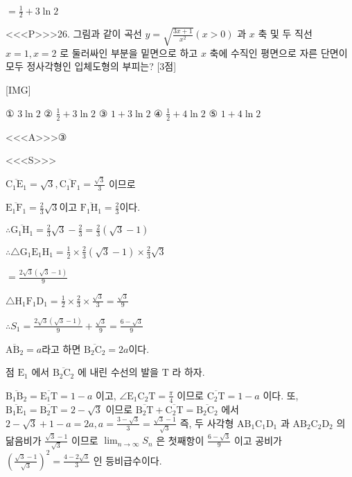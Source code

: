 \documentclass{oblivoir}
\begin{document}
$=\frac{1}{2}+3 \ln 2$


<<<P>>>26. 그림과 같이 곡선 $y=\sqrt{\frac{3 x+1}{x^{2}}}(x>0)$ 과 $x$ 축 및 두 직선 $x=1, x=2$ 로 둘러싸인 부분을 밑면으로 하고 $x$ 축에 수직인 평면으로 자른 단면이 모두 정사각형인 입체도형의 부피는? [3점]

[IMG]

① $3 \ln 2$
② $\frac{1}{2}+3 \ln 2$
③ $1+3 \ln 2$
④ $\frac{1}{2}+4 \ln 2$
⑤ $1+4 \ln 2$



<<<A>>>③

<<<S>>>



$\overline{\mathrm{C}_{1} \mathrm{E}_{1}}=\sqrt{3}, \overline{\mathrm{C}_{1} \mathrm{F}_{1}}=\frac{\sqrt{3}}{3}$ 이므로

$\overline{\mathrm{E}_{1} \mathrm{F}_{1}}=\frac{2}{3} \sqrt{3}$이고 $\overline{\mathrm{F}_{1} \mathrm{H}_{1}}=\frac{2}{3}$이다.

$\therefore \overline{\mathrm{G}_{1} \mathrm{H}_{1}}=\frac{2}{3} \sqrt{3}-\frac{2}{3}=\frac{2}{3}(\sqrt{3}-1)$

$\therefore \triangle \mathrm{G}_{1} \mathrm{E}_{1} \mathrm{H}_{1}=\frac{1}{2} \times \frac{2}{3}(\sqrt{3}-1) \times \frac{2}{3} \sqrt{3}$

$=\frac{2 \sqrt{3}(\sqrt{3}-1)}{9}$

$\triangle \mathrm{H}_{1} \mathrm{F}_{1} \mathrm{D}_{1}=\frac{1}{2} \times \frac{2}{3} \times \frac{\sqrt{3}}{3}=\frac{\sqrt{3}}{9}$

$\therefore S_{1}=\frac{2 \sqrt{3}(\sqrt{3}-1)}{9}+\frac{\sqrt{3}}{9}=\frac{6-\sqrt{3}}{9}$

$\overline{\mathrm{AB}_{2}}=a$라고 하면 $\overline{\mathrm{B}_{2} \mathrm{C}_{2}}=2 a$이다.


점 $\mathrm{E}_{1}$ 에서 $\overline{\mathrm{B}_{2} \mathrm{C}_{2}}$ 에 내린 수선의 발을 $\mathrm{T}$ 라 하자.

$\overline{\mathrm{B}_{1} \mathrm{B}_{2}}=\overline{\mathrm{E}_{1} \mathrm{T}}=1-a$ 이고, $\angle \mathrm{E}_{1} \mathrm{C}_{2} \mathrm{T}=\frac{\pi}{4}$ 이므로 $\overline{\mathrm{C}_{2} \mathrm{T}}=1-a$ 이다. 또, $\overline{\mathrm{B}_{1} \mathrm{E}_{1}}=\overline{\mathrm{B}_{2} \mathrm{T}}=2-\sqrt{3}$ 이므로 $\overline{\mathrm{B}_{2} \mathrm{T}}+\overline{\mathrm{C}_{2} \mathrm{T}}=\overline{\mathrm{B}_{2} \mathrm{C}_{2}}$ 에서 $2-\sqrt{3}+1-a=2 a, a=\frac{3-\sqrt{3}}{3}=\frac{\sqrt{3}-1}{\sqrt{3}}$ 즉, 두 사각형 $\mathrm{AB}_{1} \mathrm{C}_{1} \mathrm{D}_{1}$ 과 $\mathrm{AB}_{2} \mathrm{C}_{2} \mathrm{D}_{2}$ 의 닮음비가 $\frac{\sqrt{3}-1}{\sqrt{3}}$ 이므로 $\lim _{n \rightarrow \infty} S_{n}$ 은 첫째항이 $\frac{6-\sqrt{3}}{9}$ 이고 공비가 $\left(\frac{\sqrt{3}-1}{\sqrt{3}}\right)^{2}=\frac{4-2 \sqrt{3}}{3}$ 인 등비급수이다.
\end{document}
